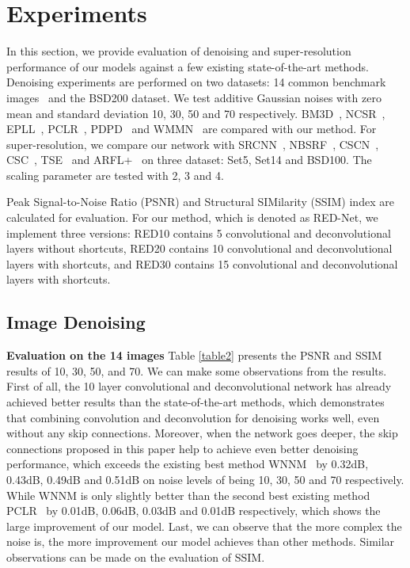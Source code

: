 
\section{Experiments}
In this section, we provide evaluation of denoising and super-resolution performance of our models against a few existing state-of-the-art methods. Denoising experiments are performed on two datasets: 14 common benchmark images~\cite{DBLP:conf/iccv/XuZZZF15,DBLP:conf/iccv/ChenZY15,DBLP:conf/cvpr/LiuXZG15,DBLP:conf/cvpr/GuZZF14} and the BSD200 dataset. We test additive Gaussian noises with zero mean and standard deviation  10, 30, 50 and 70 respectively. BM3D~\cite{DBLP:journals/tip/DabovFKE07}, NCSR~\cite{DBLP:journals/tip/DongZSL13}, EPLL~\cite{DBLP:conf/iccv/ZoranW11}, PCLR~\cite{DBLP:conf/iccv/ChenZY15}, PDPD~\cite{DBLP:conf/iccv/XuZZZF15} and WMMN~\cite{DBLP:conf/cvpr/GuZZF14} are compared with our method. For super-resolution, we compare our network with SRCNN~\cite{DBLP:journals/pami/DongLHT16}, NBSRF~\cite{DBLP:conf/iccv/SalvadorP15}, CSCN~\cite{DBLP:conf/iccv/WangLYHH15}, CSC~\cite{DBLP:conf/iccv/GuZXMFZ15}, TSE~\cite{DBLP:conf/cvpr/HuangSA15} and ARFL+~\cite{DBLP:conf/cvpr/SchulterLB15} on three dataset: Set5, Set14 and BSD100. The scaling parameter are tested with 2, 3 and 4.

Peak Signal-to-Noise Ratio (PSNR) and Structural SIMilarity (SSIM) index are calculated for evaluation. For our method, which is denoted as RED-Net, we implement three versions: RED10 contains 5 convolutional and deconvolutional layers without shortcuts, RED20 contains 10 convolutional and deconvolutional layers with shortcuts, and RED30 contains 15 convolutional and deconvolutional layers with shortcuts.

\subsection{Image Denoising}
{\bf Evaluation on the 14 images} Table \ref{table2} presents the PSNR and SSIM results of  10, 30, 50, and 70. We can make some observations from the results. First of all, the 10 layer convolutional and deconvolutional network has already achieved better results than the state-of-the-art methods, which demonstrates that combining convolution and deconvolution for denoising works well, even without any skip connections. Moreover, when the network goes deeper, the skip connections proposed in this paper help to achieve even better denoising performance, which exceeds the existing best method WNNM~\cite{DBLP:conf/cvpr/GuZZF14} by 0.32dB, 0.43dB, 0.49dB and 0.51dB on noise levels of  being 10, 30, 50 and 70 respectively. While WNNM is only slightly better than the second best existing method PCLR~\cite{DBLP:conf/iccv/ChenZY15} by 0.01dB, 0.06dB, 0.03dB and 0.01dB respectively, which shows the large improvement of our model. Last, we can observe that the more complex the noise is, the more improvement our model achieves than other methods. Similar observations can be made on the evaluation of SSIM.

